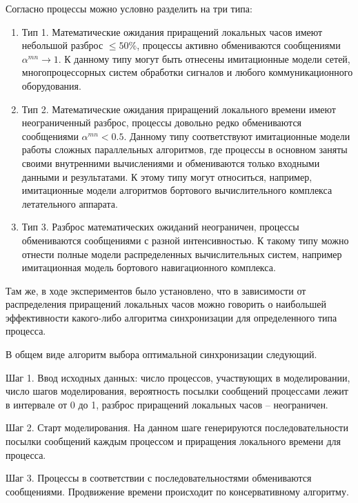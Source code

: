 Согласно \cite{voz-disser} процессы можно условно разделить на три типа: 
\begin{enumerate}
  \item Тип 1. Математические ожидания приращений локальных часов имеют небольшой разброс $\leqslant 50\%$, процессы активно обмениваются сообщениями $\alpha^{mn}\rightarrow 1$. К данному типу могут быть отнесены имитационные модели сетей, многопроцессорных систем обработки сигналов и любого коммуникационного оборудования.
  \item Тип 2. Математические ожидания приращений локального времени имеют неограниченный разброс, процессы довольно редко обмениваются сообщениями $\alpha^{mn}<0.5$. Данному типу соответствуют имитационные модели работы сложных параллельных алгоритмов, где процессы в основном заняты своими внутренними вычислениями и обмениваются только входными данными и результатами. К этому типу могут относиться, например, имитационные модели алгоритмов бортового вычислительного комплекса летательного аппарата.
  \item Тип 3. Разброс математических ожиданий неограничен, процессы обмениваются сообщениями с разной интенсивностью. К такому типу можно отнести полные модели распределенных вычислительных систем, например имитационная модель бортового навигационного комплекса.
\end{enumerate}

Там же, в ходе экспериментов было установлено, что в зависимости от распределения приращений локальных часов можно говорить о наибольшей эффективности какого-либо алгоритма синхронизации для определенного типа процесса.

В общем виде алгоритм выбора оптимальной синхронизации следующий.

Шаг 1. Ввод исходных данных: число процессов, участвующих в моделировании, число шагов моделирования, вероятность посылки сообщений процессами лежит в интервале от 0 до 1, разброс приращений локальных часов -- неограничен.

Шаг 2. Старт моделирования. На данном шаге генерируются последовательности посылки сообщений каждым процессом и приращения локального времени для процесса. 

Шаг 3. Процессы в соответствии с последовательностями обмениваются сообщениями. Продвижение времени происходит по консервативному алгоритму.


